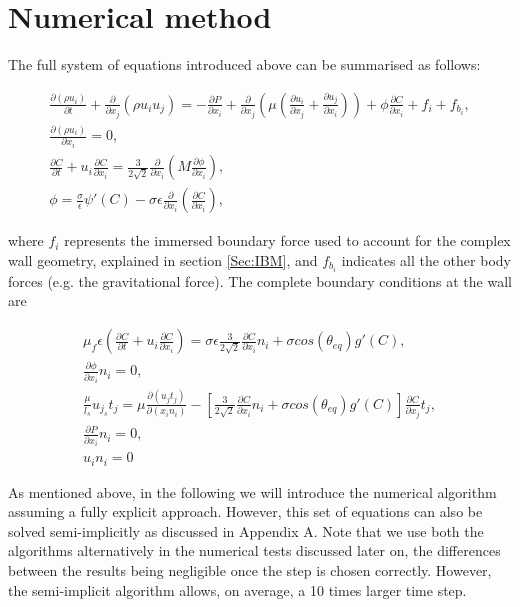 \documentclass[review]{elsarticle}
\begin{document}
\section{Numerical method} \label{sec:Numercis}
The full system of equations introduced above can be summarised as follows:
\begin{linenomath}\begin{equation} \label{SystemOfEquation}
\begin{gathered}
\frac{\partial (\rho u_i)}{\partial t} + \frac{\partial}{\partial x_j}(\rho u_i u_j) = -\frac{\partial P}{\partial x_i} + \frac{\partial}{\partial x_j} \left( \mu ( \frac{\partial u_i}{\partial x_j}+ \frac{\partial u_j}{\partial x_i})\right) + \phi \frac{\partial C}{\partial x_i} + f_i + f_{b_i},\\
\frac{\partial (\rho u_i)}{\partial x_i} = 0 ,\\
\frac{\partial C}{\partial t} + u_i \frac{\partial C}{\partial x_i} = \frac{3}{2 \sqrt 2} \frac{\partial }{\partial x_i}  \left(   M  \frac{\partial \phi}{\partial x_i}  \right) ,\\
 \phi =  \frac{\sigma}{\epsilon} {\psi}'(C) -\sigma \epsilon  \frac{\partial }{\partial x_i}  \left( \frac{\partial C}{\partial x_i} \right),
\end{gathered}
\end{equation}\end{linenomath}
where $f_i$ represents the immersed boundary force used to account for the complex wall geometry, explained in section \ref{Sec:IBM}, and $f_{b_i}$ indicates all the other body forces (e.g. the gravitational force). The complete  boundary conditions at the wall are
\begin{linenomath}\begin{equation} \label{AllBCs}  
\begin{gathered}
  \mu_f \epsilon \left( \frac{\partial C}{\partial t}+ u_i \frac{\partial C}{\partial x_i} \right)= \sigma \epsilon \frac{3}{2 \sqrt 2}\frac{\partial C}{\partial x_i}n_i + \sigma cos(\theta_{eq}) g'(C),\\
  \frac{\partial \phi}{\partial x_i}n_i =0,\\
   \frac{\mu}{l_{s}}u_{j_{s}}t_j= \mu \frac{\partial (u_j  t_j)}{\partial (x_in_i)}- \left[\frac{3}{2 \sqrt 2} \frac{\partial C}{\partial x_i}n_i + \sigma cos(\theta_{eq}) g'(C)\right]\frac{\partial C}{\partial x_j}t_j ,\\
    \frac{\partial P}{\partial x_i}n_i =0,\\
    u_in_i = 0
   \end{gathered}
\end{equation}\end{linenomath}
As mentioned above, in the following we will introduce the numerical algorithm assuming a fully explicit approach. However, this set of equations can also be solved semi-implicitly as discussed in Appendix A. Note that we use both the algorithms alternatively in the numerical tests discussed later on, the differences between the results being negligible once the step is chosen correctly. However, the semi-implicit algorithm allows, on average, a 10 times larger time step.
\end{document}

